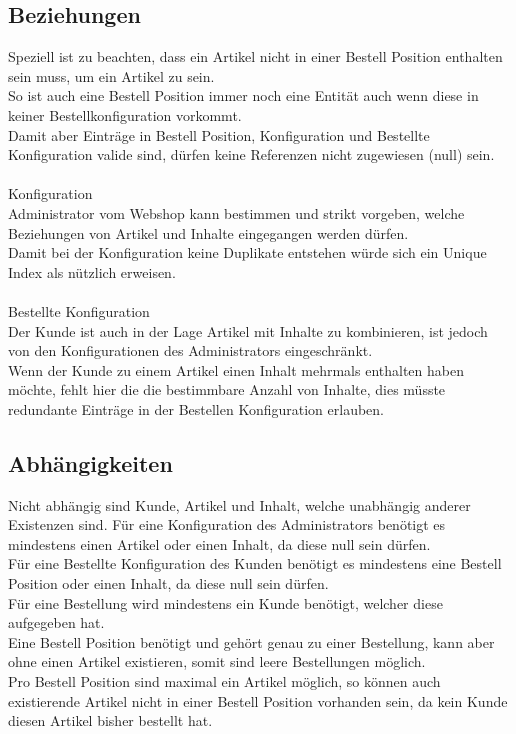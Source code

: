 \documentclass{article}
\begin{document}
\subsection{Beziehungen}
Speziell ist zu beachten, dass ein Artikel nicht in einer Bestell Position enthalten sein muss, um ein Artikel zu sein.\\
So ist auch eine Bestell Position immer noch eine Entität auch wenn diese in keiner Bestellkonfiguration vorkommt.\\
Damit aber Einträge in Bestell Position, Konfiguration und Bestellte Konfiguration valide sind, dürfen keine Referenzen nicht zugewiesen (null) sein.\\
\\
{\large Konfiguration}\\
Administrator vom Webshop kann bestimmen und strikt vorgeben, welche Beziehungen von Artikel und Inhalte eingegangen werden dürfen.\\
Damit bei der Konfiguration keine Duplikate entstehen würde sich ein Unique Index als nützlich erweisen.\\ 
\\
{\large Bestellte Konfiguration}\\
Der Kunde ist auch in der Lage Artikel mit Inhalte zu kombinieren, ist jedoch von den Konfigurationen des Administrators eingeschränkt.\\
Wenn der Kunde zu einem Artikel einen Inhalt mehrmals enthalten haben möchte, fehlt hier die die bestimmbare Anzahl von Inhalte, dies müsste redundante Einträge in der Bestellen Konfiguration erlauben.\\
\subsection{Abhängigkeiten}
Nicht abhängig sind Kunde, Artikel und Inhalt, welche unabhängig anderer Existenzen sind.
Für eine Konfiguration des Administrators benötigt es mindestens einen Artikel oder einen Inhalt, da diese null sein dürfen.\\
Für eine Bestellte Konfiguration des Kunden benötigt es mindestens eine Bestell Position oder einen Inhalt, da diese null sein dürfen.\\
Für eine Bestellung wird mindestens ein Kunde benötigt, welcher diese aufgegeben hat.\\
Eine Bestell Position benötigt und gehört genau zu einer Bestellung, kann aber ohne einen Artikel existieren, somit sind leere Bestellungen möglich.\\
Pro Bestell Position sind maximal ein Artikel möglich, so können auch existierende Artikel nicht in einer Bestell Position vorhanden sein, da kein Kunde diesen Artikel bisher bestellt hat.\\
\end{document}
